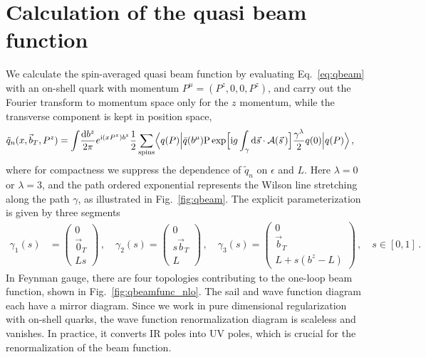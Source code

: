 \documentclass[11pt,a4paper]{article}
\DeclareRobustCommand{\eq}[1]{Eq.~\eqref{eq:#1}}
\DeclareRobustCommand{\fig}[1]{Fig.~\ref{fig:#1}}
\newcommand{\df}{\mathrm{d}}
\newcommand{\img}{\mathrm{i}}
\newcommand{\eps}{\epsilon}
\newcommand{\cA}{\mathcal{A}}
\newcommand{\bt}{\vec b_T}
\begin{document}
\section{Calculation of the quasi beam function}
\label{app:qbeamfunc}

We calculate the spin-averaged quasi beam function by evaluating \eq{qbeam}
with an on-shell quark with momentum $P^\mu = (P^z, 0, 0, P^z)$,
and carry out the Fourier transform to momentum space only for the $z$ momentum,
while the transverse component is kept in position space,
\begin{align} \label{eq:qtmd matrix element}
 \tilde q_n(x,\bt,P^z) &= \int\!\frac{\df b^z}{2\pi} e^{\img (x P^z) b^z} \frac{1}{2} \sum_\mathrm{spins} \Bigl<q(P) \Big|
  \bar q(b^\mu) \mathrm{P} \exp\Bigl[\img g \int_\gamma \df \vec s \cdot \cA(\vec s\,)\Bigr]
  \frac{\gamma^\lambda}{2} q(0)
  \Big| q(P) \Bigr>
\,,\end{align}
where for compactness we suppress the dependence of $\tilde q_n$ on $\eps$ and $L$.
Here $\lambda = 0$ or $\lambda=3$, and the path ordered exponential represents the Wilson
line stretching along the path $\gamma$, as illustrated in \fig{qbeam}.
The explicit parameterization is given by three segments
\begin{align} \label{eq:qtmd_path}
 \gamma_1(s) &= \left(\begin{matrix} 0 \\ \vec 0_T \\ L s \end{matrix}\right)
\,,\quad
 \gamma_2(s) = \left(\begin{matrix} 0 \\ s \bt  \\ L \end{matrix}\right)
\,,\quad
 \gamma_3(s) = \left(\begin{matrix} 0 \\ \bt \\ L  + s (b^z - L) \end{matrix}\right)
\,,\quad s \in [0,1]
\,.\end{align}
In Feynman gauge, there are four topologies contributing to the one-loop beam function,
shown in \fig{qbeamfunc_nlo}. The sail and wave function diagram each have a mirror diagram.
Since we work in pure dimensional regularization with on-shell quarks,
the wave function renormalization diagram is scaleless and vanishes.
In practice, it converts IR poles into UV poles, which is crucial for the renormalization of
the beam function.
\end{document}
